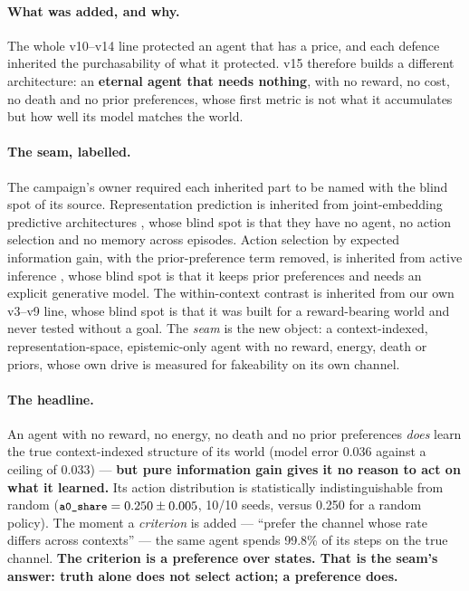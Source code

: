 \documentclass[11pt]{article}
\newcommand{\code}[1]{\texttt{\small #1}}
\begin{document}
\paragraph{What was added, and why.} The whole v10--v14 line protected an agent that
has a price, and each defence inherited the purchasability of what it protected. v15
therefore builds a different architecture: an \textbf{eternal agent that needs
nothing}, with no reward, no cost, no death and no prior preferences, whose first
metric is not what it accumulates but how well its model matches the world.

\paragraph{The seam, labelled.} The campaign's owner required each inherited part to
be named with the blind spot of its source. Representation prediction is inherited
from joint-embedding predictive architectures \cite{assran2023ijepa}, whose blind spot
is that they have no agent, no action selection and no memory across episodes. Action
selection by expected information gain, with the prior-preference term removed, is
inherited from active inference \cite{friston2010fep,mazzaglia2021active}, whose blind
spot is that it keeps prior preferences and needs an explicit generative model. The
within-context contrast is inherited from our own v3--v9 line, whose blind spot is
that it was built for a reward-bearing world and never tested without a goal. The
\emph{seam} is the new object: a context-indexed, representation-space, epistemic-only
agent with no reward, energy, death or priors, whose own drive is measured for
fakeability on its own channel.

\paragraph{The headline.} An agent with no reward, no energy, no death and no prior
preferences \emph{does} learn the true context-indexed structure of its world (model
error 0.036 against a ceiling of 0.033) --- \textbf{but pure information gain gives it
no reason to act on what it learned.} Its action distribution is statistically
indistinguishable from random ($\code{a0\_share} = 0.250 \pm 0.005$, 10/10 seeds,
versus 0.250 for a random policy). The moment a \emph{criterion} is added --- ``prefer
the channel whose rate differs across contexts'' --- the same agent spends 99.8\% of
its steps on the true channel. \textbf{The criterion is a preference over states. That
is the seam's answer: truth alone does not select action; a preference does.}
\end{document}
